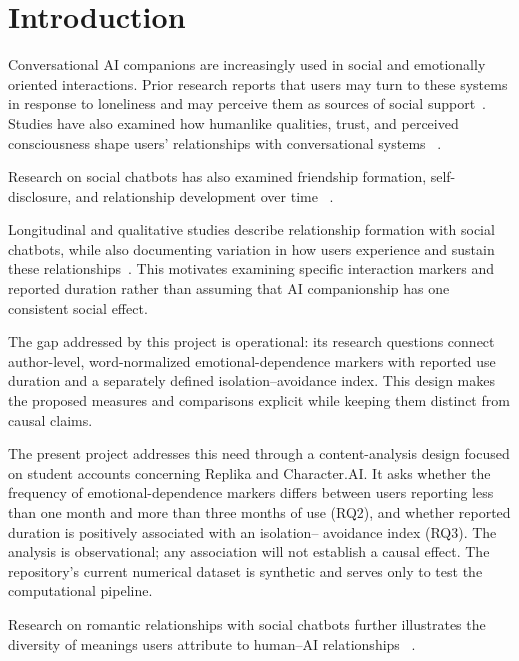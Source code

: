 \section{Introduction}
\label{sec:introduction}

Conversational AI companions are increasingly used in social and emotionally
oriented interactions. Prior research reports that users may turn to these
systems in response to loneliness and may perceive them as sources of social
support~\cite{defreitasAICompanionsReduce2024,maplesLonelinessSuicideMitigation2024}.
Studies have also examined how humanlike qualities, trust, and perceived
consciousness shape users' relationships with conversational systems~
\cite{seymourExploringInteractionsTrust2021,
guingrichAscribingConsciousnessArtificial2024}.


Research on social chatbots has also examined
friendship formation, self-disclosure, and
relationship development over time~
\cite{croesFriendMitsuku2021,
skjuveChatbotCompanion2021,
skjuveLongitudinalRelationships2022,
skjuveAIFriend2022}.


Longitudinal and qualitative studies describe relationship formation with
social chatbots, while also documenting variation in how users experience
and sustain these relationships~\cite{croesFriendMitsuku2021,
skjuveLongitudinalRelationships2022,skjuveAIFriend2022}. This motivates
examining specific interaction markers and reported duration rather than
assuming that AI companionship has one consistent social effect.

The gap addressed by this project is operational: its research questions
connect author-level, word-normalized emotional-dependence markers with
reported use duration and a separately defined isolation--avoidance index.
This design makes the proposed measures and comparisons explicit while
keeping them distinct from causal claims.

The present project addresses this need through a content-analysis design
focused on student accounts concerning Replika and Character.AI. It asks
whether the frequency of emotional-dependence markers differs between users
reporting less than one month and more than three months of use (RQ2), and
whether reported duration is positively associated with an isolation--
avoidance index (RQ3). The analysis is observational; any association will
not establish a causal effect. The repository's current numerical dataset is
synthetic and serves only to test the computational pipeline.

Research on romantic relationships with
social chatbots further illustrates the
diversity of meanings users attribute
to human--AI relationships~
\cite{panMouRomanticRelationships2024}.


